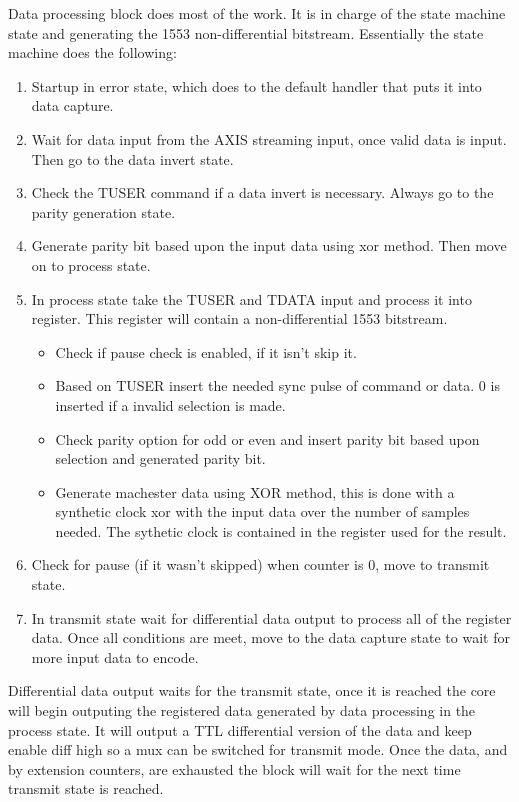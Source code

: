 \par
Data processing block does most of the work. It is in charge of the state machine state and generating the 1553 non-differential bitstream. Essentially
the state machine does the following:
\begin{enumerate}
\item Startup in error state, which does to the default handler that puts it into data capture.
\item Wait for data input from the AXIS streaming input, once valid data is input. Then go to the data invert state.
\item Check the TUSER command if a data invert is necessary. Always go to the parity generation state.
\item Generate parity bit based upon the input data using xor method. Then move on to process state.
\item In process state take the TUSER and TDATA input and process it into register. This register will contain a non-differential 1553 bitstream.
  \begin{itemize}
  \item Check if pause check is enabled, if it isn't skip it.
  \item Based on TUSER insert the needed sync pulse of command or data. 0 is inserted if a invalid selection is made.
  \item Check parity option for odd or even and insert parity bit based upon selection and generated parity bit.
  \item Generate machester data using XOR method, this is done with a synthetic clock xor with the input data over the number of samples needed. The sythetic clock is contained in the register used for the result.
  \end{itemize}
\item Check for pause (if it wasn't skipped) when counter is 0, move to transmit state.
\item In transmit state wait for differential data output to process all of the register data. Once all conditions are meet, move to the data capture state to wait for more input data to encode.
\end{enumerate}

\par
Differential data output waits for the transmit state, once it is reached the core will begin outputing the registered data generated by data processing in the process state. It will output a TTL
differential version of the data and keep enable diff high so a mux can be switched for transmit mode. Once the data, and by extension counters, are exhausted the block will wait for the next time
transmit state is reached.

